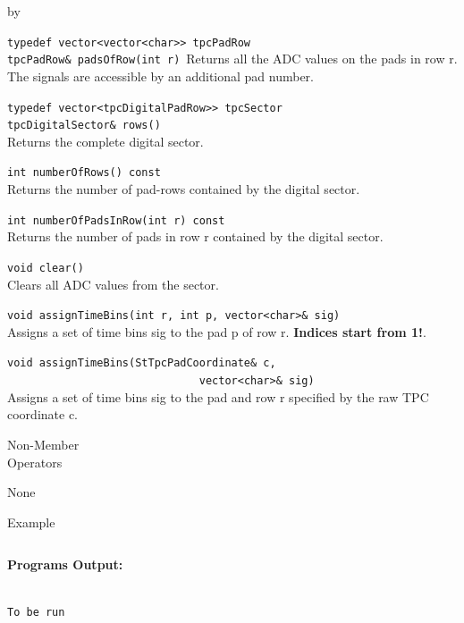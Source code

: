 \documentclass[twoside]{article}
\newcommand{\entrylabel}[1]{\mbox{\textbf{{#1}}}\hfil}%
\newenvironment{entry}
{\begin{list}{}%
    {\renewcommand{\makelabel}{\entrylabel}%
     \setlength{\labelwidth}{90pt}%
     \setlength{\leftmargin}{\labelwidth}
     \advance\leftmargin by \labelsep%
      }%
    }%
  {\end{list}}
\newcommand{\Entrylabel}[1]%
{\raisebox{0pt}[1ex][0pt]{\makebox[\labelwidth][l]%
    {\parbox[t]{\labelwidth}{\hspace{0pt}\textbf{{#1}}}}}}
\newenvironment{Entry}%
{\renewcommand{\entrylabel}{\Entrylabel}\begin{entry}}%
  {\end{entry}}
\begin{document}
\begin{Entry}
  \verb+typedef vector<vector<char>> tpcPadRow+\\
  \verb+tpcPadRow& padsOfRow(int r)+\
  Returns all the ADC values on the pads in row r.  The signals are
  accessible by an additional pad number.

  \verb+typedef vector<tpcDigitalPadRow>> tpcSector+\\
  \verb+tpcDigitalSector& rows()+\\
  Returns the complete digital sector.

  \verb+int numberOfRows() const+\\
  Returns the number of pad-rows contained by the digital
  sector.

  \verb+int numberOfPadsInRow(int r) const+\\
  Returns the number of pads in row r contained by the digital sector.

  \verb+void clear()+\\
  Clears all ADC values from the sector.

  \verb+void assignTimeBins(int r, int p, vector<char>& sig)+\\
  Assigns a set of time bins sig to the pad p of row r.
  {\bf Indices start from 1!}.

  \verb+void assignTimeBins(StTpcPadCoordinate& c,+\\
  \verb+                              vector<char>& sig)+\\
  Assigns a set of time bins sig to the pad and row r
  specified by the raw TPC coordinate c.
  
\item[Non-Member \\ Operators]

  None
  
\item[Example]

{\footnotesize
\begin{verbatim}

\end{verbatim}
}%
{\bf Programs Output:}
{\footnotesize
\begin{verbatim}

To be run

\end{verbatim}
} %

\end{Entry}
\clearpage


%
%
\end{document}
